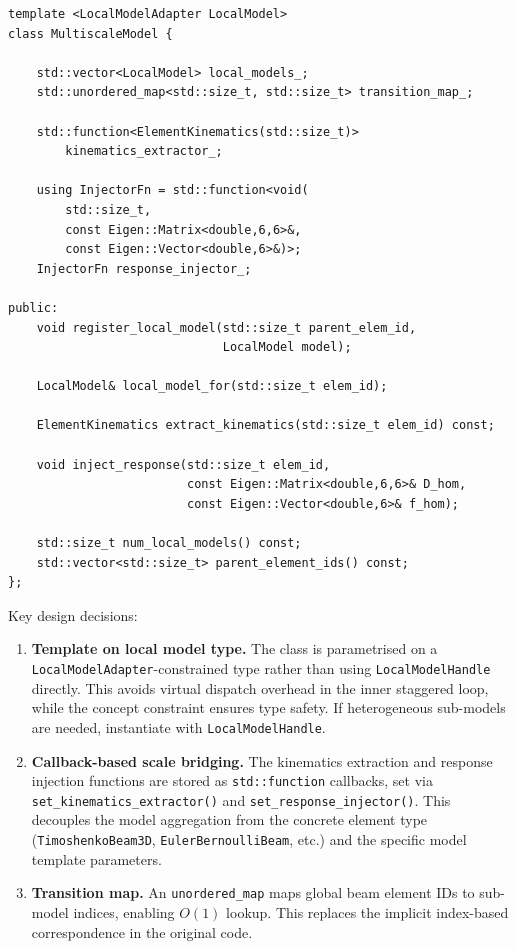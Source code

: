 \begin{lstlisting}[caption={\texttt{MultiscaleModel} class template (abridged).},
                   label={lst:multiscale-model}]
template <LocalModelAdapter LocalModel>
class MultiscaleModel {

    std::vector<LocalModel> local_models_;
    std::unordered_map<std::size_t, std::size_t> transition_map_;

    std::function<ElementKinematics(std::size_t)>
        kinematics_extractor_;

    using InjectorFn = std::function<void(
        std::size_t,
        const Eigen::Matrix<double,6,6>&,
        const Eigen::Vector<double,6>&)>;
    InjectorFn response_injector_;

public:
    void register_local_model(std::size_t parent_elem_id,
                              LocalModel model);

    LocalModel& local_model_for(std::size_t elem_id);

    ElementKinematics extract_kinematics(std::size_t elem_id) const;

    void inject_response(std::size_t elem_id,
                         const Eigen::Matrix<double,6,6>& D_hom,
                         const Eigen::Vector<double,6>& f_hom);

    std::size_t num_local_models() const;
    std::vector<std::size_t> parent_element_ids() const;
};
\end{lstlisting}

Key design decisions:

\begin{enumerate}
  \item \textbf{Template on local model type.}  The class is
    parametrised on a \texttt{LocalModelAdapter}-constrained type
    rather than using \texttt{LocalModelHandle} directly.  This
    avoids virtual dispatch overhead in the inner staggered loop,
    while the concept constraint ensures type safety.  If
    heterogeneous sub-models are needed, instantiate with
    \texttt{LocalModelHandle}.

  \item \textbf{Callback-based scale bridging.}  The kinematics
    extraction and response injection functions are stored as
    \texttt{std::function} callbacks, set via
    \texttt{set\_kinematics\_extractor()} and
    \texttt{set\_response\_injector()}.  This decouples the model
    aggregation from the concrete element type
    (\texttt{TimoshenkoBeam3D}, \texttt{EulerBernoulliBeam}, etc.)
    and the specific model template parameters.

  \item \textbf{Transition map.}  An \texttt{unordered\_map} maps
    global beam element IDs to sub-model indices, enabling $O(1)$
    lookup.  This replaces the implicit index-based correspondence
    in the original code.
\end{enumerate}


